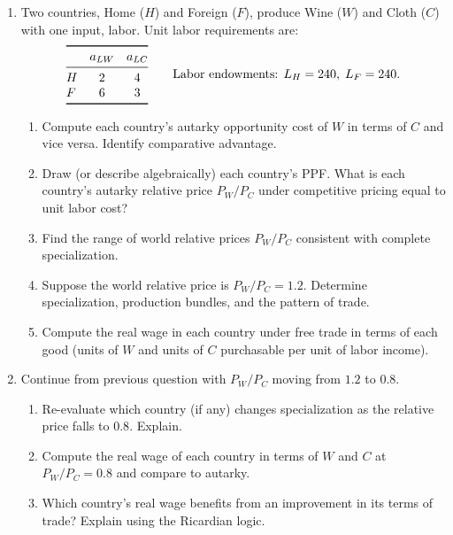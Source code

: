 \documentclass[11pt]{article}
\begin{document}
\begin{enumerate}[leftmargin=*, resume]
\item 
Two countries, Home ($H$) and Foreign ($F$), produce Wine ($W$) and Cloth ($C$) with one input, labor. Unit labor requirements are:
\[
\begin{array}{@{}lcc@{}}
\toprule
 & a_{LW} & a_{LC} \\
\midrule
H & 2 & 4 \\
F & 6 & 3 \\
\bottomrule
\end{array}
\qquad
\text{Labor endowments: } L_H=240,\; L_F=240.
\]
\begin{enumerate}
\item Compute each country’s autarky opportunity cost of $W$ in terms of $C$ and vice versa. Identify comparative advantage.
\item Draw (or describe algebraically) each country’s PPF. What is each country’s autarky relative price $P_W/P_C$ under competitive pricing equal to unit labor cost?
\item Find the range of world relative prices $P_W/P_C$ consistent with complete specialization.
\item Suppose the world relative price is $P_W/P_C=1.2$. Determine specialization, production bundles, and the pattern of trade.
\item Compute the real wage in each country under free trade in terms of each good (units of $W$ and units of $C$ purchasable per unit of labor income).
\end{enumerate}

\item 
Continue from previous question with $P_W/P_C$ moving from $1.2$ to $0.8$.
\begin{enumerate}
\item Re-evaluate which country (if any) changes specialization as the relative price falls to $0.8$. Explain.
\item Compute the real wage of each country in terms of $W$ and $C$ at $P_W/P_C=0.8$ and compare to autarky.
\item Which country’s real wage benefits from an improvement in its terms of trade? Explain using the Ricardian logic.
\end{enumerate}


\end{enumerate}
\end{document}
